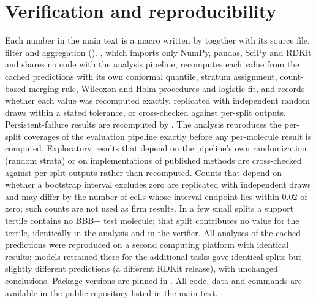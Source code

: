 \documentclass[10pt]{article}
\begin{document}
\FloatBarrier
\section{Verification and reproducibility}\label{sec:verify}
Each number in the main text is a macro written by  together with its source file, filter and aggregation (). , which imports only NumPy, pandas, SciPy and RDKit and shares no code with the analysis pipeline, recomputes each value from the cached predictions with its own conformal quantile, stratum assignment, count-based merging rule, Wilcoxon and Holm procedures and logistic fit, and records whether each value was recomputed exactly, replicated with independent random draws within a stated tolerance, or cross-checked against per-split outputs. Persistent-failure results are recomputed by . The analysis reproduces the per-split coverages of the evaluation pipeline exactly before any per-molecule result is computed. Exploratory results that depend on the pipeline's own randomization (random strata) or on implementations of published methods are cross-checked against per-split outputs rather than recomputed. Counts that depend on whether a bootstrap interval excludes zero are replicated with independent draws and may differ by the number of cells whose interval endpoint lies within 0.02 of zero; such counts are not used as firm results. In a few small splits a support tertile contains no BBB$-$ test molecule; that split contributes no value for the tertile, identically in the analysis and in the verifier. All analyses of the cached predictions were reproduced on a second computing platform with identical results; models retrained there for the additional tasks gave identical splits but slightly different predictions (a different RDKit release), with unchanged conclusions. Package versions are pinned in . All code, data and commands are available in the public repository listed in the main text.

\clearpage

{\small}
\end{document}
